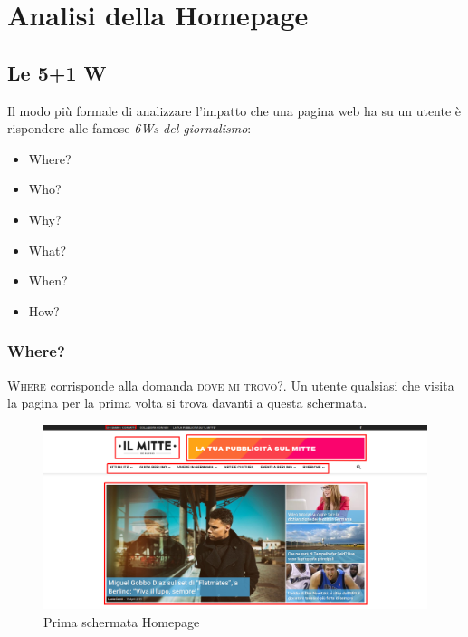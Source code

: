 \newpage
\section{Analisi della Homepage}

\subsection{Le 5+1 W}
Il modo più formale di analizzare l'impatto che una pagina web ha su un utente è rispondere alle famose \textit{6Ws del giornalismo}:
\begin{itemize}
\item Where?
\item Who?
\item Why?
\item What?
\item When?
\item How?
\end{itemize}

\subsubsection{Where?}
\textsc{Where} corrisponde alla domanda \textsc{dove mi trovo?}. Un utente qualsiasi che visita la pagina per la prima volta si trova davanti a questa schermata.

\vspace{30pt}
\begin{figure}[htbp]
\begin{center}
\includegraphics[width=35em]{img/home1}
\caption{Prima schermata Homepage}
\end{center}
\end{figure}
\vspace{30pt}

